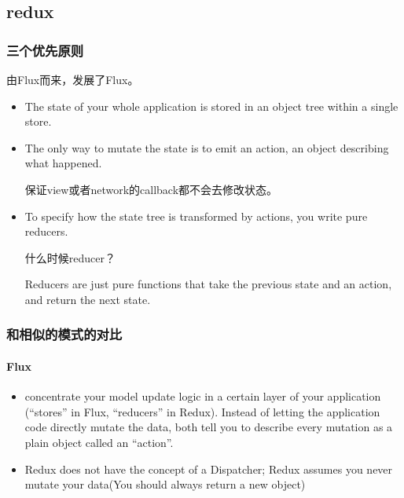 \subsection{redux}

\subsubsection{三个优先原则}

由Flux而来，发展了Flux。

\begin{itemize}

\item The state of your whole application is stored in an object tree within a single store.

\item The only way to mutate the state is to emit an action, an object describing what happened.

保证view或者network的callback都不会去修改状态。

\item To specify how the state tree is transformed by actions, you write pure reducers.

什么时候reducer？

Reducers are just pure functions that take the previous state and an action, and return the next state. 

\end{itemize}

\subsubsection{和相似的模式的对比}

\paragraph{Flux}

\begin{itemize}

\item concentrate your model update logic in a certain layer of your application (“stores” in Flux, “reducers” in Redux). Instead of letting the application code directly mutate the data, both tell you to describe every mutation as a plain object called an “action”.

\item Redux does not have the concept of a Dispatcher; Redux assumes you never mutate your data(You should always return a new object)



\end{itemize}

